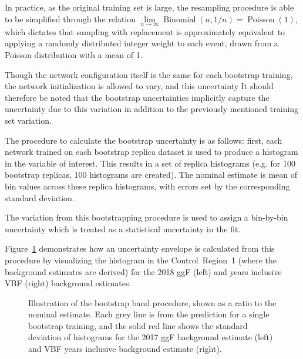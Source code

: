 In practice, as the original training set is large, the resampling procedure is
able to be simplified through the relation $\lim\limits_{n\rightarrow \infty}
	\operatorname{Binomial}(n, 1/n) = \operatorname{Poisson}(1)$, which dictates that sampling
with replacement is approximately equivalent to applying a randomly distributed
integer weight to each event, drawn from a Poisson distribution with a mean of 1.

Though the network configuration itself is the same for each bootstrap training, the
network initialization is allowed to vary, and this uncertainty
 It should therefore be noted that the bootstrap
uncertainties implicitly capture the uncertainty due to this variation in addition to
the previously mentioned training set variation.

The procedure to calculate the bootstrap uncertainty is as follows: first, each network trained on each bootstrap replica dataset is used
to produce a histogram in the variable of interest. This results in a set of 
replica histograms (e.g. for 100 bootstrap replicas, 100 histograms are created). 
The nominal estimate is mean of bin values across these replica histograms, 
with errors set by the corresponding standard deviation.

The variation from this bootstrapping procedure is used to assign a bin-by-bin uncertainty
which is treated as a statistical uncertainty in the fit. 

Figure~\ref{fig:bootstrap-breakdown} demonstrates how an uncertainty envelope is calculated from this procedure by visualizing the \mhh histogram in the Control~Region~1 (where the background estimates are derived) for the 2018 ggF (left) and years inclusive VBF (right) background estimates.

\def\figpath{figures/nr-int-note/systematics/V5/}
\begin{figure}[ht]
	\centering
	\caption{Illustration of the bootstrap band procedure, shown as a ratio to the nominal estimate. 
	Each grey line is from the \mhh prediction for a single bootstrap training, and the solid red line shows the standard deviation of histograms for the 2017 ggF background estimate (left) and VBF years inclusive background estimate (right). 
		}
	\label{fig:bootstrap-breakdown}
\end{figure}

